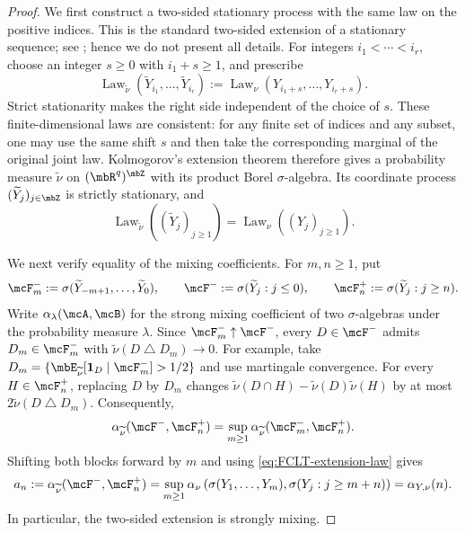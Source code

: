 \documentclass[a4paper]{article}
\numberwithin{equation}{section}   %
\theoremstyle{plain}   %
\theoremstyle{plain}   %
\theoremstyle{examplestyle}
\begin{document}
    \begin{proof}
        We first construct a two-sided stationary process with the same law on the positive indices. 
        This is the standard two-sided extension of a stationary sequence; see \cite{Kallenberg_2021}; hence we do not present all details. 
        For integers $i_1<\cdots<i_r$, choose an integer  $s\ge0$ with $i_1+s\ge1$, and prescribe
        \[
             \operatorname{Law}_{\widetilde\nu}
               (\widetilde Y_{i_1},\ldots,\widetilde Y_{i_r})
             :=\operatorname{Law}_{\nu}(Y_{i_1+s},\ldots,Y_{i_r+s}).
        \]
        Strict stationarity makes the right side independent of the choice of $s$. 
        These finite-dimensional laws are consistent: for any finite set of indices and any subset, one may use the same shift $s$ and then take the corresponding marginal of the original joint law.
        Kolmogorov's extension theorem therefore gives a probability measure $\widetilde\nu$ on $(\mbR^q)^{\mbZ}$ with its product Borel $\sigma$-algebra. 
        Its coordinate process $(\widetilde Y_j)_{j\in\mbZ}$ is strictly stationary, and
        \begin{equation}
        \label{eq:FCLT-extension-law}
         \operatorname{Law}_{\widetilde\nu}
               ((\widetilde Y_j)_{j\ge1})
         =\operatorname{Law}_{\nu}((Y_j)_{j\ge1}).
        \end{equation}
        
        We next verify equality of the mixing coefficients. For $m,n\ge1$, put
        \[
             \mcF_m^-:=\sigma(\widetilde Y_{-m+1},\ldots,\widetilde Y_0),
             \qquad
             \mcF^-:=\sigma(\widetilde Y_j:j\le0),
             \qquad
             \mcF_n^+:=\sigma(\widetilde Y_j:j\ge n).
        \]
        Write $\alpha_\lambda(\mcA,\mcB)$ for the strong mixing coefficient of two $\sigma$-algebras under the probability measure $\lambda$. 
        Since $\mcF_m^-\uparrow\mcF^-$, every $D\in\mcF^-$ admits $D_m\in\mcF_m^-$ with  $\widetilde\nu(D\mathbin\triangle D_m)\to0$.
        For example, take  $D_m=\{\mbE_{\widetilde\nu}[\mathbf1_D\mid\mcF_m^-]>1/2\}$ and use martingale convergence.
        For every $H\in\mcF_n^+$, replacing $D$ by $D_m$ changes $\widetilde\nu(D\cap H)-\widetilde\nu(D)\widetilde\nu(H)$ by at most $2\widetilde\nu(D\mathbin\triangle D_m)$.
        Consequently,
        \[
             \alpha_{\widetilde\nu}(\mcF^-,\mcF_n^+)
             =\sup_{m\ge1}
                   \alpha_{\widetilde\nu}(\mcF_m^-,\mcF_n^+).
        \]
        Shifting both blocks forward by $m$ and using \eqref{eq:FCLT-extension-law} gives
        \begin{align*}
             a_n
             :=\alpha_{\widetilde\nu}(\mcF^-,\mcF_n^+)
             =\sup_{m\ge1}
                \alpha_\nu\left(\sigma(Y_1,\ldots,Y_m),
                                 \sigma(Y_j:j\ge m+n)\right)
             =\alpha_{Y,\nu}(n).
        \end{align*}
        In particular, the two-sided extension is strongly mixing.
        

\end{proof}
\end{document}
